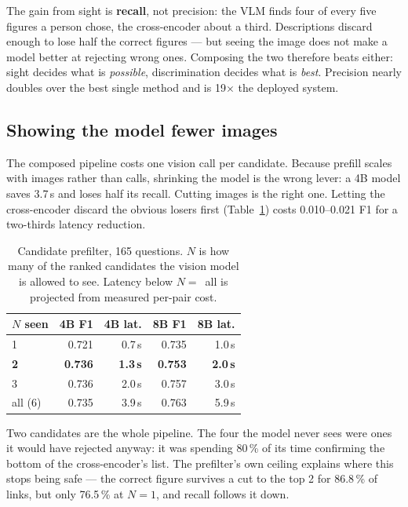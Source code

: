 \documentclass[journal]{IEEEtran}
\begin{document}
The gain from sight is \textbf{recall}, not precision: the VLM finds four of every
five figures a person chose, the cross-encoder about a third. Descriptions discard
enough to lose half the correct figures --- but seeing the image does not make a
model better at rejecting wrong ones. Composing the two therefore beats either:
sight decides what is \emph{possible}, discrimination decides what is
\emph{best}. Precision nearly doubles over the best single method and is
19$\times$ the deployed system.

\subsection{Showing the model fewer images}

The composed pipeline costs one vision call per candidate. Because prefill scales
with images rather than calls, shrinking the model is the wrong lever: a 4B model
saves 3.7\,s and loses half its recall. Cutting images is the right one. Letting
the cross-encoder discard the obvious losers first (Table~\ref{tab:prefilter})
costs 0.010--0.021 F1 for a two-thirds latency reduction.

\begin{table}[t]
\caption{Candidate prefilter, 165 questions. $N$ is how many of the ranked
candidates the vision model is allowed to see. Latency below $N=$~all is projected
from measured per-pair cost.}
\label{tab:prefilter}
\centering
\begin{tabular}{@{}lrrrr@{}}
\toprule
$N$ seen & 4B F1 & 4B lat. & 8B F1 & 8B lat. \\
\midrule
1 & 0.721 & 0.7\,s & 0.735 & 1.0\,s \\
\textbf{2} & \textbf{0.736} & \textbf{1.3\,s} & \textbf{0.753} & \textbf{2.0\,s} \\
3 & 0.736 & 2.0\,s & 0.757 & 3.0\,s \\
all (6) & 0.735 & 3.9\,s & 0.763 & 5.9\,s \\
\bottomrule
\end{tabular}
\end{table}

Two candidates are the whole pipeline. The four the model never sees were ones it
would have rejected anyway: it was spending 80\,\% of its time confirming the
bottom of the cross-encoder's list. The prefilter's own ceiling explains where
this stops being safe --- the correct figure survives a cut to the top 2 for
86.8\,\% of links, but only 76.5\,\% at $N=1$, and recall follows it down.
\end{document}

